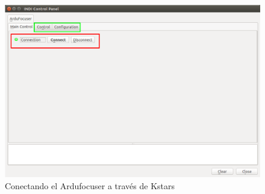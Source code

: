 \begin{figure}
	\centering
	\includegraphics[width=1\linewidth]{../images/01_connection}
	\caption{Conectando el Ardufocuser a través de Kstars}
	\label{fig:test_2}
\end{figure}


